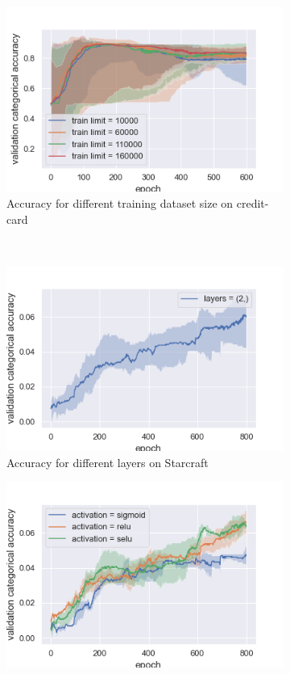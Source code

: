 \documentclass[10pt]{article}
\begin{document}
\begin{figure}
\begin{subfigure}[]{0.45\columnwidth}
				\includegraphics[width=\linewidth]{../graphics/per_creditcard_epoch_score_type_train_limit.png}
				\caption{Accuracy for different training dataset size on credit-card}
				\label{per_cc_tl}
			\end{subfigure}~
			\begin{subfigure}[]{0.45\columnwidth}
				\centering
				\includegraphics[width=\linewidth]{../graphics/per_starcraft_epoch_score_type_layers.png}
				\caption{Accuracy for different layers on Starcraft}
				\label{per_sc_layers}
			\end{subfigure}
			\begin{subfigure}[]{0.45\columnwidth}
				\centering
				\includegraphics[width=\linewidth]{../graphics/per_starcraft_epoch_score_type_activation.png}

\end{subfigure}
\end{figure}
\end{document}
